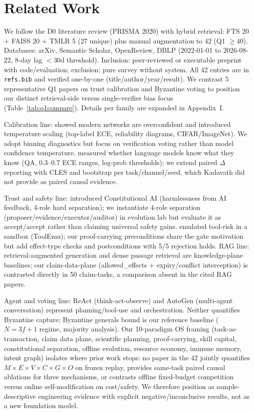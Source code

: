 \documentclass[10pt]{article}
\begin{document}
\section{Related Work}
We follow the D0 literature review (PRISMA 2020) with hybrid retrieval: FTS 20 + FAISS 20 + TMLR 5 (27 unique) plus manual augmentation to 42 (Q1 $\ge 40$). Databases: arXiv, Semantic Scholar, OpenReview, DBLP (2022-01-01 to 2026-08-22, 8-day lag $<30$d threshold). Inclusion: peer-reviewed or executable preprint with code/evaluation; exclusion: pure survey without system. All 42 entries are in {\tt refs.bib} and verified one-by-one (title/author/year/result). We contrast 5 representative Q1 papers on trust calibration and Byzantine voting to position our distinct retrieval-side versus single-verifier bias focus (Table~\ref{tab:q1compare}). Details per family are expanded in Appendix~I.

Calibration line: \citet{guo2017calibration} showed modern networks are overconfident and introduced temperature scaling (top-label ECE, reliability diagrams, CIFAR/ImageNet). We adopt binning diagnostics but focus on verification voting rather than model confidence temperature. \citet{kadavath2022language} measured whether language models know what they know (QA, 0.3--0.7 ECE ranges, log-prob thresholds); we extend paired $\Delta$ reporting with CLES and bootstrap per task/channel/seed, which Kadavath did not provide as paired causal evidence.

Trust and safety line: \citet{bai2022constitutional} introduced Constitutional AI (harmlessness from AI feedback, 4-role hard separation); we instantiate 4-role separation (proposer/evidence/executor/auditor) in evolution lab but evaluate it as accept/accept rather than claiming universal safety gains. \citet{ruan2023toolemu} emulated tool-risk in a sandbox (ToolEmu); our proof-carrying preconditions share the gate motivation but add effect-type checks and postconditions with 5/5 rejection holds. RAG line: \citet{lewis2020rag} retrieval-augmented generation and \citet{karpukhin2020dense} dense passage retrieval are knowledge-plane baselines; our claim-data-plane (allowed\_effects + expiry/conflict interception) is contrasted directly in 50 claim-tasks, a comparison absent in the cited RAG papers.

Agent and voting line: \citet{yao2023react} ReAct (think-act-observe) and \citet{wu2023autogen} AutoGen (multi-agent conversation) represent planning/tool-use and orchestration. Neither quantifies Byzantine capture; \citet{lamport1982} Byzantine generals bound is our reference baseline ($N{=}3f{+}1$ regime, majority analysis). Our 10-paradigm OS framing (task-as-transaction, claim data plane, scientific planning, proof-carrying, skill capital, constitutional separation, offline evolution, resource economy, immune memory, intent graph) isolates where prior work stops: no paper in the 42 jointly quantifies $M{\times}E{\times}V{\times}C{\times}G{\times}O$ on frozen replay, provides same-task paired causal ablations for three mechanisms, or contrasts offline fixed-budget competition versus online self-modification on cost/safety. We therefore position as sample-descriptive engineering evidence with explicit negative/inconclusive results, not as a new foundation model.
\end{document}
